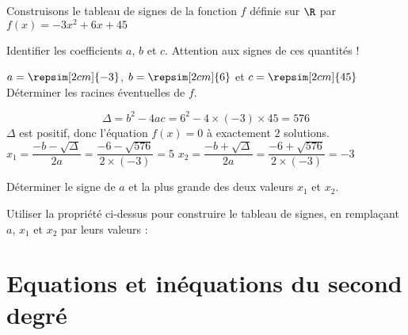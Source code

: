 \begin{Methode}
Construisons le tableau de signes de la fonction $f$ définie sur $\R$ par $f(x)=-3x^2+6x+45$
\begin{tcbenumerate}
\tcbitem Identifier les coefficients $a$, $b$ et $c$. Attention aux signes de ces quantités !

$a=\repsim[2cm]{-3}$, $b=\repsim[2cm]{6}$ et $c=\repsim[2cm]{45}$
\tcbitem Déterminer les racines éventuelles de $f$.
\begin{crep}[colback=white]
\[\Delta  =  b^2-4ac  =  6^2-4 \times (-3) \times 45  =  576\]
$\Delta$ est positif, donc l'équation $f(x)=0$ à exactement $2$ solutions.\\

$x_1  =  \dfrac{-b-\sqrt{\Delta}}{2a}  =  \dfrac{-6-\sqrt{576}}{2\times (-3)} =  5$ \hfill $x_2 = \dfrac{-b+\sqrt{\Delta}}{2a}  =  \dfrac{-6+\sqrt{576}}{2\times (-3)}  =  -3$
\end{crep}
\end{tcbenumerate}
\begin{tcbenumerate}[2][3]
\tcbitem[boxrule=0.4pt,colframe=black] Déterminer le signe de $a$ et la plus grande des deux valeurs $x_1$ et $x_2$.
\begin{tcbenumerate}[1][1][alph]
\tcbitem  {}
\tcbitem  {}
\end{tcbenumerate}
\tcbitem Utiliser la propriété ci-dessus pour construire le tableau de signes, en remplaçant $a$, $x_1$ et $x_2$  par leurs valeurs :
\begin{crep}[colback=white,colframe=white,halign=center]
\end{crep}

\end{tcbenumerate}
\end{Methode}

\section{Equations et inéquations du second degré}
